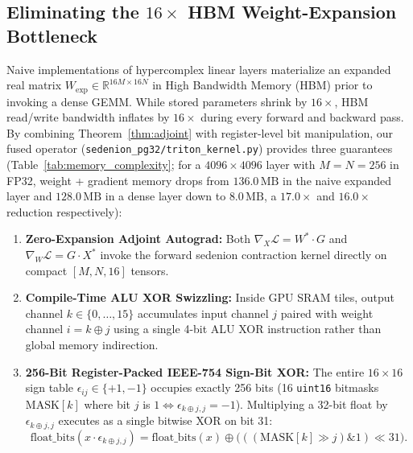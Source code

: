 \documentclass[11pt,a4paper]{article}
\theoremstyle{definition}
\theoremstyle{remark}
\newcommand{\R}{\mathbb{R}}
\begin{document}
\subsection{Eliminating the $16\times$ HBM Weight-Expansion Bottleneck}
Naive implementations of hypercomplex linear layers materialize an expanded real matrix $W_{\mathrm{exp}} \in \R^{16M \times 16N}$ in High Bandwidth Memory (HBM) prior to invoking a dense GEMM. While stored parameters shrink by $16\times$, HBM read/write bandwidth inflates by $16\times$ during every forward and backward pass. By combining Theorem~\ref{thm:adjoint} with register-level bit manipulation, our fused operator (\texttt{sedenion\_pg32/triton\_kernel.py}) provides three guarantees (Table~\ref{tab:memory_complexity}; for a $4096 \times 4096$ layer with $M = N = 256$ in FP32, weight + gradient memory drops from $136.0\,\mathrm{MB}$ in the naive expanded layer and $128.0\,\mathrm{MB}$ in a dense layer down to $\mathbf{8.0\,\mathrm{MB}}$, a $17.0\times$ and $16.0\times$ reduction respectively):
\begin{enumerate}
    \item \textbf{Zero-Expansion Adjoint Autograd:} Both $\nabla_X \mathcal{L} = W^* \cdot G$ and $\nabla_W \mathcal{L} = G \cdot X^*$ invoke the forward sedenion contraction kernel directly on compact $[M, N, 16]$ tensors.
    \item \textbf{Compile-Time ALU XOR Swizzling:} Inside GPU SRAM tiles, output channel $k \in \{0, \dots, 15\}$ accumulates input channel $j$ paired with weight channel $i = k \oplus j$ using a single 4-bit ALU XOR instruction rather than global memory indirection.
    \item \textbf{256-Bit Register-Packed IEEE-754 Sign-Bit XOR:} The entire $16 \times 16$ sign table $\epsilon_{ij} \in \{+1, -1\}$ occupies exactly 256 bits (16 \texttt{uint16} bitmasks $\mathrm{MASK}[k]$ where bit $j$ is $1 \iff \epsilon_{k \oplus j, j} = -1$). Multiplying a 32-bit float by $\epsilon_{k \oplus j, j}$ executes as a single bitwise XOR on bit 31:
    \begin{equation}
    \label{eq:ieee_xor}
    \mathrm{float\_bits}(x \cdot \epsilon_{k \oplus j, j}) = \mathrm{float\_bits}(x) \oplus \big(((\mathrm{MASK}[k] \gg j) \mathbin{\&} 1) \ll 31\big).
    \end{equation}
\end{enumerate}
\end{document}
